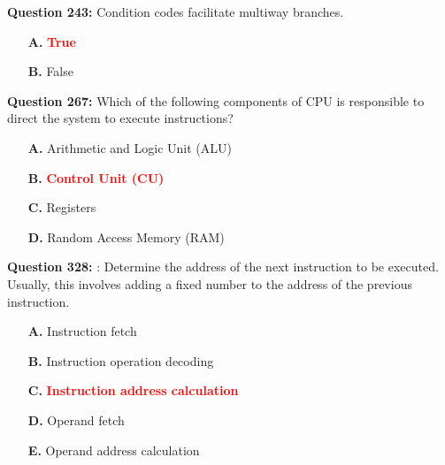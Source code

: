 \documentclass[12pt,a4paper]{article}
\begin{document}
\vspace{0.5cm}

\textbf{Question 243:} Condition codes facilitate multiway branches.

\begin{itemize}
    \item[\textbf{A.}] \textcolor{red}{\textbf{True}}
    \item[\textbf{B.}] False
\end{itemize}

\vspace{0.5cm}

\vspace{0.5cm}

\textbf{Question 267:} Which of the following components of CPU is responsible to direct the system to execute instructions?

\begin{itemize}
    \item[\textbf{A.}] Arithmetic and Logic Unit (ALU)
    \item[\textbf{B.}] \textcolor{red}{\textbf{Control Unit (CU)}}
    \item[\textbf{C.}] Registers
    \item[\textbf{D.}] Random Access Memory (RAM)
\end{itemize}

\vspace{0.5cm}

\vspace{0.5cm}

\textbf{Question 328:} \underline{\hspace{1.5cm}} : Determine the address of the next instruction to be executed. Usually, this involves adding a fixed number to the address of the previous instruction.

\begin{itemize}
    \item[\textbf{A.}] Instruction fetch
    \item[\textbf{B.}] Instruction operation decoding
    \item[\textbf{C.}] \textcolor{red}{\textbf{Instruction address calculation}}
    \item[\textbf{D.}] Operand fetch
    \item[\textbf{E.}] Operand address calculation
\end{itemize}

\vspace{0.5cm}

\vspace{0.5cm}
\end{document}
